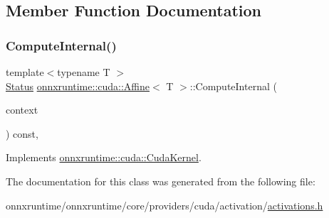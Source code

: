 \subsection{Member Function Documentation}
\mbox{\label{classonnxruntime_1_1cuda_1_1Affine_a4827c81adfbb36f9f48367e7928961ce}} 
\subsubsection{\texorpdfstring{Compute\+Internal()}{ComputeInternal()}}
{\footnotesize\ttfamily template$<$typename T $>$ \\
\mbox{\hyperlink{classonnxruntime_1_1common_1_1Status}{Status}} \mbox{\hyperlink{classonnxruntime_1_1cuda_1_1Affine}{onnxruntime\+::cuda\+::\+Affine}}$<$ T $>$\+::Compute\+Internal (\begin{DoxyParamCaption}\item[{\mbox{\hyperlink{classonnxruntime_1_1OpKernelContext}{Op\+Kernel\+Context}} $\ast$}]{context }\end{DoxyParamCaption}) const\hspace{0.3cm}{\ttfamily [override]}, {\ttfamily [virtual]}}



Implements \mbox{\hyperlink{classonnxruntime_1_1cuda_1_1CudaKernel_aca7af04ae448017d6023d30bba231ebb}{onnxruntime\+::cuda\+::\+Cuda\+Kernel}}.



The documentation for this class was generated from the following file\+:\begin{DoxyCompactItemize}
\item 
onnxruntime/onnxruntime/core/providers/cuda/activation/\mbox{\hyperlink{cuda_2activation_2activations_8h}{activations.\+h}}\end{DoxyCompactItemize}
